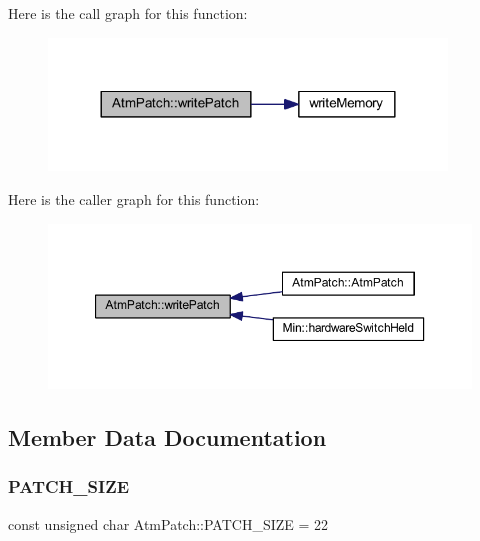 Here is the call graph for this function\+:
\nopagebreak
\begin{figure}[H]
\begin{center}
\leavevmode
\includegraphics[width=300pt]{class_atm_patch_a5814cd528970cb153dd67865a6b86c85_cgraph}
\end{center}
\end{figure}
Here is the caller graph for this function\+:
\nopagebreak
\begin{figure}[H]
\begin{center}
\leavevmode
\includegraphics[width=350pt]{class_atm_patch_a5814cd528970cb153dd67865a6b86c85_icgraph}
\end{center}
\end{figure}


\subsection{Member Data Documentation}
\mbox{\label{class_atm_patch_a1ae078abd4f165fa8b0eb14d0acd48c0}} 
\subsubsection{\texorpdfstring{P\+A\+T\+C\+H\+\_\+\+S\+I\+ZE}{PATCH\_SIZE}}
{\footnotesize\ttfamily const unsigned char Atm\+Patch\+::\+P\+A\+T\+C\+H\+\_\+\+S\+I\+ZE = 22\hspace{0.3cm}{\ttfamily [static]}}



